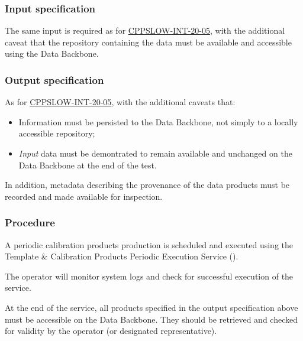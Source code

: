 \subsubsection{Input specification}

The same input is required as for
\hyperref[cppslow-int-20-05]{CPPSLOW-INT-20-05}, with the additional caveat
that the repository containing the data must be available and accessible using
the Data Backbone.

\subsubsection{Output specification}

As for \hyperref[cppslow-int-20-05]{CPPSLOW-INT-20-05}, with the additional
caveats that:

\begin{itemize}

  \item{Information must be persisted to the Data Backbone, not simply to a
  locally accessible repository;}

  \item{\textit{Input} data must be demontrated to remain available and
  unchanged on the Data Backbone at the end of the test.}

\end{itemize}

In addition, metadata describing the provenance of the data products must be
recorded and made available for inspection.

\subsubsection{Procedure}

A periodic calibration products production is scheduled and executed using the
Template \& Calibration Products Periodic Execution Service
().

The operator will monitor system logs and check for successful execution of
the service.

At the end of the service, all products specified in the output specification
above must be accessible on the Data Backbone. They should be retrieved and
checked for validity by the operator (or designated representative).
